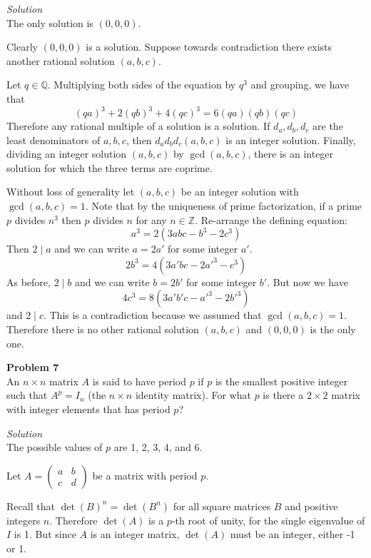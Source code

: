 \documentclass{amsart}
\begin{document}
\textit{Solution}\\
The only solution is $(0, 0, 0)$.

Clearly $(0, 0, 0)$ is a solution.
Suppose towards contradiction there exists another rational solution $(a, b, c)$.

Let $q \in \mathbb{Q}$.
Multiplying both sides of the equation by $q^3$ and grouping, we have that
\[ (qa)^3 + 2(qb)^3 + 4(qc)^3 = 6(qa)(qb)(qc) \]
Therefore any rational multiple of a solution is a solution.
If $d_a, d_b, d_c$ are the least denominators of $a, b, c$, then $d_ad_bd_c(a, b, c)$ is an integer solution.
Finally, dividing an integer solution $(a, b, c)$ by $\gcd(a, b, c)$, there is an integer solution for which the three terms are coprime.

Without loss of generality let $(a, b, c)$ be an integer solution with $\gcd(a, b, c) = 1$.
Note that by the uniqueness of prime factorization, if a prime $p$ divides $n^3$ then $p$ divides $n$ for any $n \in \mathbb{Z}$.
Re-arrange the defining equation:
\[ a^3 = 2(3abc - b^3 - 2c^3) \]
Then $2 \mid a$ and we can write $a = 2a'$ for some integer $a'$.
\[ 2b^3 = 4(3a'bc - 2a'^3 - c^3) \]
As before, $2 \mid b$ and we can write $b = 2b'$ for some integer $b'$.
But now we have
\[ 4c^3 = 8(3a'b'c - a'^3 - 2b'^3) \]
and $2 \mid c$.
This is a contradiction because we assumed that $\gcd(a, b, c) = 1$.
Therefore there is no other rational solution $(a, b, c)$ and $(0, 0, 0)$ is the only one.

\pagebreak

\textbf{Problem 7}\\
An $n \times n$ matrix $A$ is said to have period $p$ if $p$ is the smallest positive integer such that $A^p = I_n$ (the $n \times n$ identity matrix).
For what $p$ is there a $2 \times 2$ matrix with integer elements that has period $p$?

\textit{Solution}\\
The possible values of $p$ are 1, 2, 3, 4, and 6.

Let $A = \begin{pmatrix} a & b \\ c & d \end{pmatrix}$ be a matrix with period $p$.

Recall that $\det(B)^n = \det(B^n)$ for all square matrices $B$ and positive integers $n$.
Therefore $\det(A)$ is a $p$-th root of unity, for the single eigenvalue of $I$ is 1.
But since $A$ is an integer matrix, $\det(A)$ must be an integer, either -1 or 1.
\end{document}
